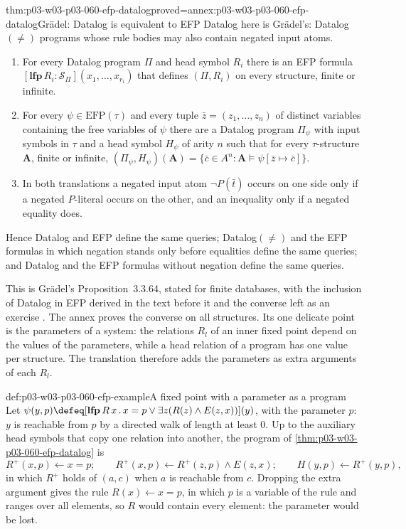 \begin{hbtheorem}{thm:p03-w03-p03-060-efp-datalog}{proved=annex:p03-w03-p03-060-efp-datalog}{Gr\"adel: Datalog is equivalent to EFP}
Datalog here is Gr\"adel's: Datalog\((\neq)\) programs whose rule bodies
may also contain negated input atoms.
\begin{enumerate}
\item For every Datalog program \(\Pi\) and head symbol \(R_i\) there is an
      EFP formula \([\mathbf{lfp}\,R_i:\mathcal S_\Pi](x_1,\ldots,x_{r_i})\)
      that defines \((\Pi,R_i)\) on every structure, finite or infinite.
\item For every \(\psi\in\mathrm{EFP}(\tau)\) and every tuple
      \(\bar z=(z_1,\ldots,z_n)\) of distinct variables containing the free
      variables of \(\psi\) there are a Datalog program \(\Pi_\psi\) with
      input symbols in \(\tau\) and a head symbol \(H_\psi\) of arity \(n\)
      such that for every \(\tau\)-structure \(\mathbf A\), finite or
      infinite,
      \((\Pi_\psi,H_\psi)(\mathbf A)=\{\bar c\in A^n:\mathbf A\models\psi[\bar z\mapsto\bar c]\}\).
\item In both translations a negated input atom \(\neg P(\bar t)\) occurs
      on one side only if a negated \(P\)-literal occurs on the other, and
      an inequality only if a negated equality does.
\end{enumerate}
Hence Datalog and EFP define the same queries; Datalog\((\neq)\) and the
EFP formulas in which negation stands only before equalities define the
same queries; and Datalog and the EFP formulas without negation define the
same queries.
\end{hbtheorem}

This is Gr\"adel's Proposition~3.3.64, stated for finite databases, with
the inclusion of Datalog in EFP derived in the text before it and the
converse left as an exercise \cite[pp.~181--182]{Gradel2007FMTDescriptiveChapter}.
The annex proves the converse on all structures. Its one delicate point is
the parameters of a system: the relations \(R_l\) of an inner fixed point
depend on the values of the parameters, while a head relation of a program
has one value per structure. The translation therefore adds the parameters
as extra arguments of each \(R_l\).

\begin{hbexample}{def:p03-w03-p03-060-efp-example}{A fixed point with a parameter as a program}
Let \(\psi(y,p)\defeq[\mathbf{lfp}\,R\,x\,.\,x=p\vee\exists z(R(z)\wedge E(z,x))](y)\),
with the parameter \(p\): \(y\) is reachable from \(p\) by a directed walk
of length at least \(0\). Up to the auxiliary head symbols that copy one
relation into another, the program of
\cref{thm:p03-w03-p03-060-efp-datalog} is
\[
 R^+(x,p)\leftarrow x=p;\qquad
 R^+(x,p)\leftarrow R^+(z,p)\wedge E(z,x);\qquad
 H(y,p)\leftarrow R^+(y,p),
\]
in which \(R^+\) holds of \((a,c)\) when \(a\) is reachable from \(c\).
Dropping the extra argument gives the rule \(R(x)\leftarrow x=p\), in which
\(p\) is a variable of the rule and ranges over all elements, so \(R\)
would contain every element: the parameter would be lost.
\end{hbexample}

